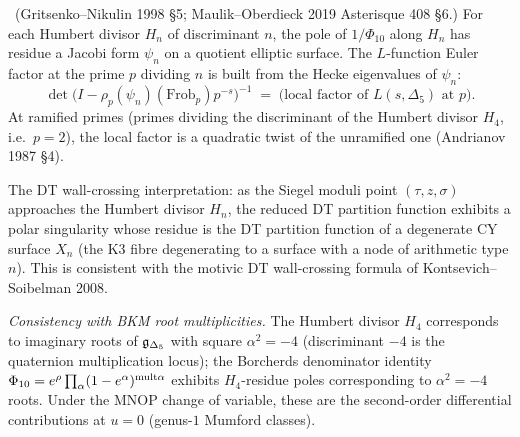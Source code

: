 \ClaimStatusDerivation\ (Gritsenko--Nikulin 1998 \S5; Maulik--Oberdieck
2019 Asterisque 408 \S6.) For each Humbert divisor $H_n$ of
discriminant $n$, the pole of $1/\Phi_{10}$ along $H_n$ has
residue a Jacobi form $\psi_n$ on a quotient elliptic surface.
The $L$-function Euler factor at the prime $p$ dividing $n$ is
built from the Hecke eigenvalues of $\psi_n$:
\[
\det\bigl(I-\rho_p(\psi_n)(\mathrm{Frob}_p)p^{-s}\bigr)^{-1}
\;=\;\text{(local factor of $L(s,\Delta_5)$ at $p$)}.
\]
At ramified primes (primes dividing the discriminant of the
Humbert divisor $H_4$, i.e.\ $p=2$), the local factor is a
quadratic twist of the unramified one (Andrianov 1987 \S4).

The DT wall-crossing interpretation: as the Siegel moduli point
$(\tau,z,\sigma)$ approaches the Humbert divisor $H_n$, the
reduced DT partition function exhibits a polar singularity whose
residue is the DT partition function of a degenerate CY surface
$X_n$ (the K3 fibre degenerating to a surface with a node of
arithmetic type $n$). This is consistent with the motivic DT
wall-crossing formula of Kontsevich--Soibelman 2008.

\emph{Consistency with BKM root multiplicities.} The Humbert
divisor $H_4$ corresponds to imaginary roots of
$\mathfrak{g}_{\Delta_5}$ with square $\alpha^2=-4$ (discriminant $-4$ is
the quaternion multiplication locus); the Borcherds denominator
identity
$\Phi_{10}=e^{\rho}\prod_\alpha(1-e^\alpha)^{\mathrm{mult}\alpha}$
exhibits $H_4$-residue poles corresponding to $\alpha^2=-4$
roots. Under the MNOP change of variable, these are the
second-order differential contributions at $u=0$ (genus-$1$
Mumford classes).

